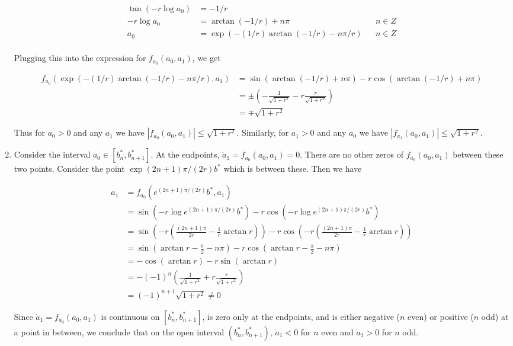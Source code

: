 \documentclass[12pt]{article}
\begin{document}
\begin{enumerate}
\begin{align*}
\tan(-r \log a_0) &= -1/r \\
-r \log a_0 &= \arctan(-1/r) + n \pi && n \in Z \\
a_0 &= \exp\left( -(1/r) \arctan(-1/r) - n \pi/r \right) && n \in Z \\
\end{align*}

Plugging this into the expression for $f_{a_0}(a_0, a_1)$, we get

\begin{align*}
f_{a_0}(\exp(-(1/r) \arctan(-1/r) - n \pi/r), a_1) &=
\sin(\arctan(-1/r) + n \pi) - r \cos(\arctan(-1/r) + n \pi) \\
&= \pm \left( -\frac{1}{\sqrt{1 + r^2}} - r \frac{r}{\sqrt{1 + r^2}} \right) \\
&= \mp \sqrt{1 + r^2}
\end{align*}

Thus for $a_0 > 0$ and any $a_1$ we have $|f_{a_0}(a_0, a_1)| \leq \sqrt{1 + r^2}$. Similarly, for $a_1 > 0$ and any $a_0$ we have $|f_{a_1}(a_0, a_1)| \leq \sqrt{1 + r^2}$. 

\item Consider the interval $a_0 \in [b^*_n, b^*_{n+1}]$. At the endpoints, $\dot a_1 = f_{a_0}(a_0, a_1) = 0$. There are no other zeros of $f_{a_0}(a_0, a_1)$ between these two points. Consider the point $\exp{(2n+1)\pi/(2r) }b^*$ which is between these. Then we have

\begin{align*}
a_1 &= f_{a_0}(e^{(2n+1) \pi / (2r)}b^*, a_1) \\
&= \sin(-r \log e^{(2n+1) \pi / (2r)} b^* ) - r \cos( -r \log e^{(2n+1) \pi / (2r)} b^* ) \\
&= \sin\left(-r \left( \frac{(2n + 1)\pi}{2r} - \frac{1}{r} \arctan r \right) \right) - r \cos\left(-r \left( \frac{(2n + 1)\pi}{2r} - \frac{1}{r} \arctan r \right) \right) \\
&= \sin\left(\arctan r - \frac{\pi}{2} - n \pi \right) - r \cos\left(\arctan r - \frac{\pi}{2} - n \pi \right) \\
&= -\cos\left(\arctan r \right) - r \sin\left(\arctan r\right) \\
&= -(-1)^n \left( \frac{1}{\sqrt{1+r^2}} + r \frac{r}{\sqrt{1+r^2}}  \right) \\
&= (-1)^{n+1}\sqrt{1 + r^2} \neq 0
\end{align*}

Since $\dot a_1 = f_{a_0}(a_0, a_1)$ is continuous on $[b^*_n, b^*_{n+1}]$, is zero only at the endpoints, and is either negative ($n$ even) or positive ($n$ odd) at a point in between, we conclude that on the open interval $(b^*_n, b^*_{n+1})$, $\dot a_1 < 0$ for $n$ even and $\dot a_1 > 0$ for $n$ odd.\\


\end{enumerate}
\end{document}
